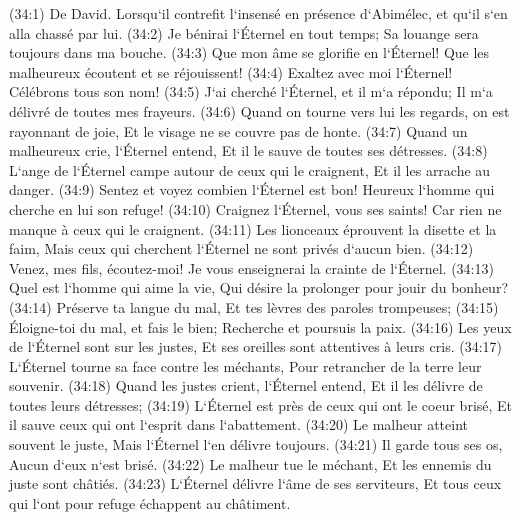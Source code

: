 \verse (34:1) De David. Lorsqu`il contrefit l`insensé en présence d`Abimélec, et qu`il s`en alla chassé par lui. (34:2) Je bénirai l`Éternel en tout temps; Sa louange sera toujours dans ma bouche. 
\verse (34:3) Que mon âme se glorifie en l`Éternel! Que les malheureux écoutent et se réjouissent! 
\verse (34:4) Exaltez avec moi l`Éternel! Célébrons tous son nom! 
\verse (34:5) J`ai cherché l`Éternel, et il m`a répondu; Il m`a délivré de toutes mes frayeurs. 
\verse (34:6) Quand on tourne vers lui les regards, on est rayonnant de joie, Et le visage ne se couvre pas de honte. 
\verse (34:7) Quand un malheureux crie, l`Éternel entend, Et il le sauve de toutes ses détresses. 
\verse (34:8) L`ange de l`Éternel campe autour de ceux qui le craignent, Et il les arrache au danger. 
\verse (34:9) Sentez et voyez combien l`Éternel est bon! Heureux l`homme qui cherche en lui son refuge! 
\verse (34:10) Craignez l`Éternel, vous ses saints! Car rien ne manque à ceux qui le craignent. 
\verse (34:11) Les lionceaux éprouvent la disette et la faim, Mais ceux qui cherchent l`Éternel ne sont privés d`aucun bien. 
\verse (34:12) Venez, mes fils, écoutez-moi! Je vous enseignerai la crainte de l`Éternel. 
\verse (34:13) Quel est l`homme qui aime la vie, Qui désire la prolonger pour jouir du bonheur? 
\verse (34:14) Préserve ta langue du mal, Et tes lèvres des paroles trompeuses; 
\verse (34:15) Éloigne-toi du mal, et fais le bien; Recherche et poursuis la paix. 
\verse (34:16) Les yeux de l`Éternel sont sur les justes, Et ses oreilles sont attentives à leurs cris. 
\verse (34:17) L`Éternel tourne sa face contre les méchants, Pour retrancher de la terre leur souvenir. 
\verse (34:18) Quand les justes crient, l`Éternel entend, Et il les délivre de toutes leurs détresses; 
\verse (34:19) L`Éternel est près de ceux qui ont le coeur brisé, Et il sauve ceux qui ont l`esprit dans l`abattement. 
\verse (34:20) Le malheur atteint souvent le juste, Mais l`Éternel l`en délivre toujours. 
\verse (34:21) Il garde tous ses os, Aucun d`eux n`est brisé. 
\verse (34:22) Le malheur tue le méchant, Et les ennemis du juste sont châtiés. 
\verse (34:23) L`Éternel délivre l`âme de ses serviteurs, Et tous ceux qui l`ont pour refuge échappent au châtiment. 

\chapter{}

